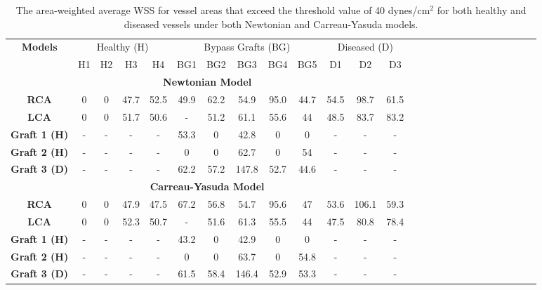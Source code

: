 ﻿\documentclass[12pt,a4paper]{article}
\theoremstyle{definition}
\numberwithin{equation}{section}
\begin{document}
\begin{table}[h!]
\centering
    \setlength{\tabcolsep}{5pt}
    \renewcommand{\arraystretch}{0.9}
    \caption{The area-weighted average WSS for vessel areas that exceed the threshold value of 40 dynes/cm$^2$ for both healthy and diseased vessels under both Newtonian and Carreau-Yasuda models.}    \begin{tabular}{|c|c|c|c|c|c|c|c|c|c|c|c|c|c|c|c|c|c|c|c|c|c|c|c|c|c|} 
    \hline 
    \multirow{2}{*}{\textbf{Models}} & \multicolumn{4}{c|}{Healthy (H)} & \multicolumn{5}{c|}{Bypass Grafts (BG)} &\multicolumn{3}{c|}{Diseased (D)} \\ \cline{2-13}& H1 & H2 & H3 & H4 & BG1 & BG2 & BG3 & BG4 & BG5 & D1 & D2 & D3 \\ \hline
 \multicolumn{13}{|c|}{\textbf{Newtonian Model}}\\ \hline  \textbf{RCA}& 0 & 0 & 47.7 & 52.5& 49.9 & 62.2 & 54.9 & 95.0 & 44.7 &54.5 & 98.7 &61.5  \\ \hline  \textbf{LCA}& 0 & 0 & 51.7 & 50.6& - &51.2 & 61.1 & 55.6 & 44 & 48.5 &83.7& 83.2  \\ \hline 
   \textbf{Graft 1 (H)}& - & - & - & -& 53.3 & 0 & 42.8 & 0 & 0 & - &-& -  \\ \hline 
   \textbf{Graft 2 (H)}& - & - & - & -& 0 & 0 & 62.7 & 0 & 54 & - &-& - \\ \hline 
   \textbf{Graft 3 (D)}& - & - & - & -& 62.2 & 57.2 & 147.8 & 52.7 & 44.6 & - &-& - \\ \hline
 \multicolumn{13}{|c|}{\textbf{Carreau-Yasuda Model}}\\ \hline  \textbf{RCA}& 0 & 0 & 47.9 & 47.5& 67.2 & 56.8 & 54.7 & 95.6 & 47 &53.6 & 106.1 &59.3  \\ \hline  
 \textbf{LCA}& 0 & 0 & 52.3 & 50.7& - &51.6 & 61.3 & 55.5 & 44 & 47.5 &80.8& 78.4  \\ \hline 
   \textbf{Graft 1 (H)}& - & - & - & -& 43.2 & 0 & 42.9 & 0 & 0 & - &-& -  \\ \hline 
   \textbf{Graft 2 (H)}& - & - & - & -& 0 & 0 & 63.7 & 0 & 54.8 & - &-& - \\ \hline 
   \textbf{Graft 3 (D)}& - & - & - & -& 61.5 & 58.4 & 146.4 & 52.9 & 53.3 & - &-& - \\ \hline
    \end{tabular}
    \label{tab:e}
\end{table}
\end{document}
